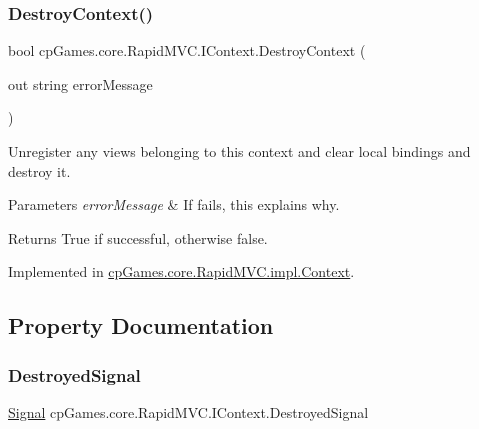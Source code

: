 \subsubsection{\texorpdfstring{DestroyContext()}{DestroyContext()}}
{\footnotesize\ttfamily bool cp\+Games.\+core.\+Rapid\+M\+V\+C.\+I\+Context.\+Destroy\+Context (\begin{DoxyParamCaption}\item[{out string}]{error\+Message }\end{DoxyParamCaption})}



Unregister any views belonging to this context and clear local bindings and destroy it. 


\begin{DoxyParams}{Parameters}
{\em error\+Message} & If fails, this explains why.\\
\hline
\end{DoxyParams}
\begin{DoxyReturn}{Returns}
True if successful, otherwise false.
\end{DoxyReturn}


Implemented in \mbox{\hyperlink{classcp_games_1_1core_1_1_rapid_m_v_c_1_1impl_1_1_context_ab8b1ac2f255993564212c4055944f372}{cp\+Games.\+core.\+Rapid\+M\+V\+C.\+impl.\+Context}}.



\subsection{Property Documentation}
\mbox{\label{interfacecp_games_1_1core_1_1_rapid_m_v_c_1_1_i_context_a59f314929b2f01751bdf6f2a00586e80}} 
\subsubsection{\texorpdfstring{DestroyedSignal}{DestroyedSignal}}
{\footnotesize\ttfamily \mbox{\hyperlink{classcp_games_1_1core_1_1_rapid_m_v_c_1_1_signal}{Signal}} cp\+Games.\+core.\+Rapid\+M\+V\+C.\+I\+Context.\+Destroyed\+Signal\hspace{0.3cm}{\ttfamily [get]}}



